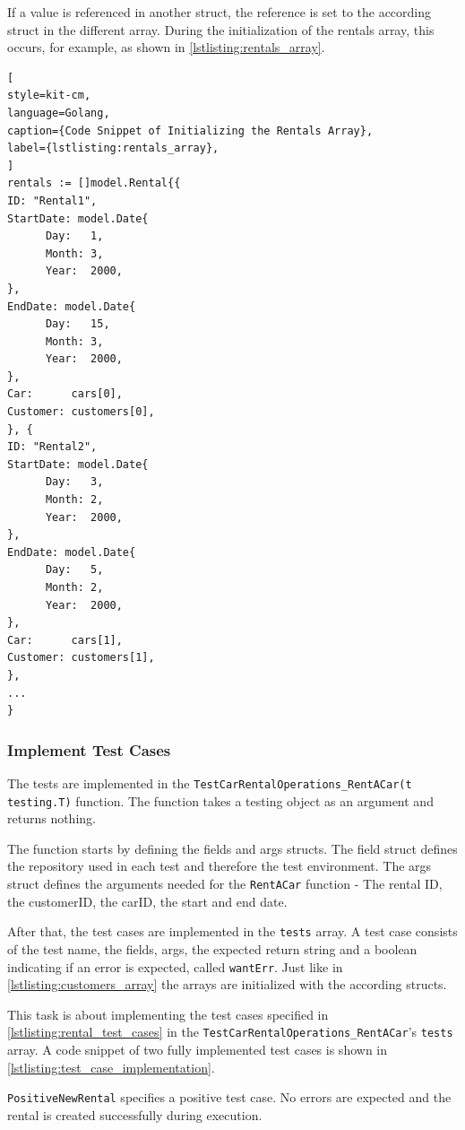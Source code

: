 If a value is referenced in another struct, the reference is set to the according struct in the different array.
During the initialization of the rentals array, this occurs, for example, as shown in \autoref{lstlisting:rentals_array}.

\begin{lstlisting}[
style=kit-cm,
language=Golang,
caption={Code Snippet of Initializing the Rentals Array},
label={lstlisting:rentals_array},
]
rentals := []model.Rental{{
ID: "Rental1",
StartDate: model.Date{
      Day:   1,
      Month: 3,
      Year:  2000,
},
EndDate: model.Date{
      Day:   15,
      Month: 3,
      Year:  2000,
},
Car:      cars[0],
Customer: customers[0],
}, {
ID: "Rental2",
StartDate: model.Date{
      Day:   3,
      Month: 2,
      Year:  2000,
},
EndDate: model.Date{
      Day:   5,
      Month: 2,
      Year:  2000,
},
Car:      cars[1],
Customer: customers[1],
},
...
}
\end{lstlisting}

\subsubsection*{Implement Test Cases}
The tests are implemented in the \texttt{TestCarRentalOperations\_RentACar(t \*testing.T)} function.
The function takes a testing object as an argument and returns nothing.

The function starts by defining the fields and args structs.
The field struct defines the repository used in each test and therefore the test environment.
The args struct defines the arguments needed for the \texttt{RentACar} function - The rental ID, the customerID, the carID, the start and end date.

After that, the test cases are implemented in the \texttt{tests} array.
A test case consists of the test name, the fields, args, the expected return string and a boolean indicating if an error is expected, called \texttt{wantErr}.
Just like in \autoref{lstlisting:customers_array} the arrays are initialized with the according structs.

This task is about implementing the test cases specified in \autoref{lstlisting:rental_test_cases} in the \hfill \linebreak \texttt{TestCarRentalOperations\_RentACar}'s \texttt{tests} array.
A code snippet of two fully implemented test cases is shown in \autoref{lstlisting:test_case_implementation}.

\texttt{PositiveNewRental} specifies a positive test case.
No errors are expected and the rental is created successfully during execution.

